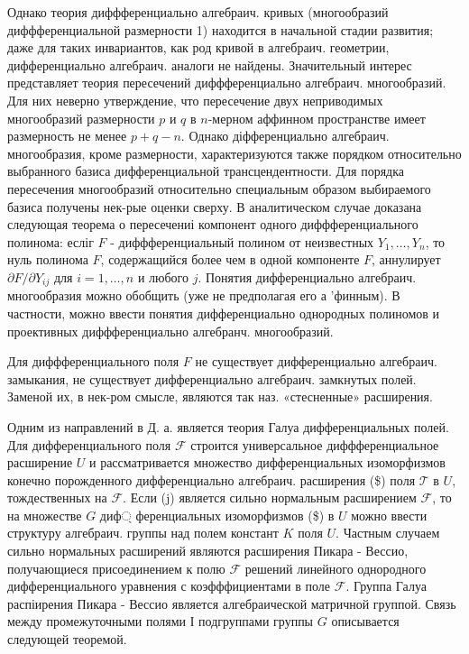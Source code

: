 \documentclass[10pt]{article}
\begin{document}
Однако теория диффференциально алгебраич. кривых (многообразий диффференциальной размерности 1) находится в начальной стадии развития; даже для таких инвариантов, как род кривой в алгебраич. геометрии, дифференциально алгебраич. аналоги не найдены. Значительный интерес представляет теория пересечений диффференциально алгебраич. многообразий. Для них неверно утверждение, что пересечение двух неприводимых многообразий размерности $p$ и $q$ в $n$-мерном аффинном пространстве имеет размерность не менее $p+q-n$. Однако діфференциально алгебраич. многообразия, кроме размерности, характеризуются также порядком относительно выбранного базиса дифференциальной трансцендентности. Для порядка пересечения многообразий относительно специальным образом выбираемого базиса получены нек-рые оценки сверху. В аналитическом случае доказана следующая теорема о пересечениі компонент одного диффференциального полинома: есліг $F$ - диффференциальный полином от неизвестных $Y_{1}, \ldots, Y_{n}$, то нуль полинома $F$, содержащийся более чем в одной компоненте $F$, аннулирует $\partial F / \partial Y_{i j}$ для $i=1, \ldots, n$ и любого $j$. Понятия дифференциально алгебраич. многообразия можно обобщить (уже не предполагая его а 'финным). В частности, можно ввести понятия дифференциально однородных полиномов и проективных диффференциально алгебранч. многообразий.



Для диффференциального поля $F$ не существует дифференциально алгебраич. замыкания, не существует дифференциально алгебраич. замкнутых полей. Заменой их, в нек-ром смысле, являются так наз. «стесненные» расширения.



Одним из направлений в Д. а. является теория Галуа дифференциальных полей. Для дифференциального поля $\mathscr{F}$ строится универсальное диффференциальное расширение $U$ и рассматривается множество дифференциальных изоморфизмов конечно порожденного дифференциально алгебраич. расширения (\$) поля $\mathscr{T}$ в $U$, тождественных на $\mathscr{F}$. Если (j) является сильно нормальным расширением $\mathscr{F}$, то на множестве $G$ диф্ ференциальных изоморфизмов (\$) в $U$ можно ввести структуру алгебраич. группы над полем констант $K$ поля $U$. Частным случаем сильно нормальных расширений являются расширения Пикара - Вессио, получающиеся присоединением к полю $\mathscr{F}$ решений линейного однородного дифференциального уравнения с коэфффициентами в поле $\mathscr{F}$. Группа Галуа распіирения Пикара - Вессио является алгебраической матричной группой. Связь между промежуточными полями І подгруппами группы $G$ описывается следующей теоремой.
\end{document}
